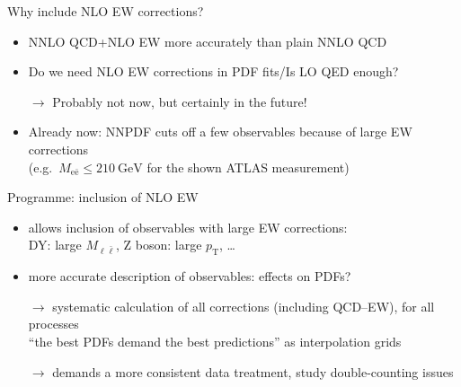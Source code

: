 \begin{frame}{Why include NLO EW corrections?}
\fontsize{9}{11}\selectfont
\begin{itemize}
\item NNLO QCD+NLO EW more accurately than plain NNLO QCD
\item Do we need NLO EW corrections in PDF fits/Is LO QED enough?
\item[$\rightarrow$] Probably not now, but certainly in the future!
\item Already now: NNPDF cuts off a few observables because of large EW corrections\\
(e.g.\ $M_{\mathrm{e} \bar{\mathrm{e}}} \le \SI{210}{\giga\electronvolt}$ for the shown ATLAS measurement)
\end{itemize}
\vspace*{\fill}
\begin{block}{Programme: inclusion of NLO EW}
\begin{itemize}
\item allows \alert{inclusion} of observables with large EW corrections:\\
DY: large $M_{\ell \bar{\ell}}$, Z boson: large $p_\mathrm{T}$, \ldots
\item more \alert{accurate description} of observables: effects on PDFs?
\item[$\rightarrow$] systematic calculation of \alert{all} corrections (including QCD--EW), for \alert{all} processes\\
\enquote{the best PDFs demand the best predictions} as \alert{interpolation grids}
\item[$\rightarrow$] demands a more consistent data treatment, study \alert{double-counting} issues
\end{itemize}
\end{block}
\end{frame}


